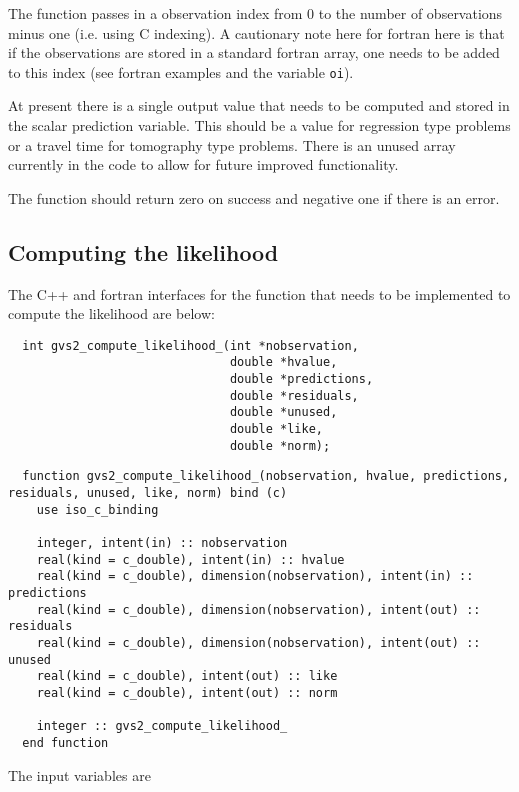 \documentclass{article}
\begin{document}
The function passes in a observation index from 0 to the number of
observations minus one (i.e. using C indexing). A cautionary note here
for fortran here is that if the observations are stored in a standard
fortran array, one needs to be added to this index (see fortran
examples and the variable {\tt oi}).

At present there is a single output value that needs to be computed and
stored in the scalar prediction variable. This should be a value for regression
type problems or a travel time for tomography type problems. There is an unused
array currently in the code to allow for future improved functionality.

The function should return zero on success and negative one if there is an error.

\subsection{Computing the likelihood}

The C++ and fortran interfaces for the function that needs to be implemented
to compute the likelihood are below:

\begin{verbatim}
  int gvs2_compute_likelihood_(int *nobservation,
                               double *hvalue,
                               double *predictions,
                               double *residuals,
                               double *unused,
                               double *like,
                               double *norm);
\end{verbatim}

\begin{verbatim}
  function gvs2_compute_likelihood_(nobservation, hvalue, predictions, residuals, unused, like, norm) bind (c)
    use iso_c_binding
    
    integer, intent(in) :: nobservation
    real(kind = c_double), intent(in) :: hvalue
    real(kind = c_double), dimension(nobservation), intent(in) :: predictions
    real(kind = c_double), dimension(nobservation), intent(out) :: residuals
    real(kind = c_double), dimension(nobservation), intent(out) :: unused
    real(kind = c_double), intent(out) :: like
    real(kind = c_double), intent(out) :: norm

    integer :: gvs2_compute_likelihood_
  end function
\end{verbatim}

The input variables are
\end{document}
